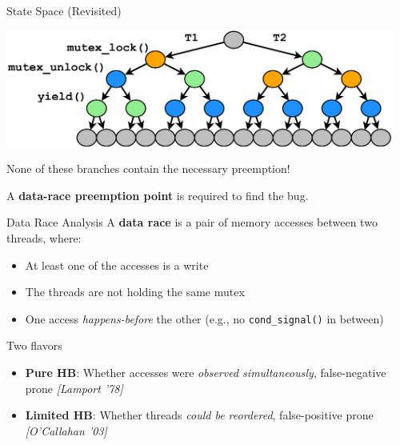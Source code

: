 \documentclass[xcolor=dvipsnames]{beamer}
\begin{document}
\begin{frame}{State Space (Revisited)}
	\begin{center}
		\includegraphics[width=0.96\textwidth]{../../oopsla/tree-maximal-only.pdf}
		\linegap

		None of these branches contain the necessary preemption!
		\linegap

		A {\bf data-race preemption point} is required to find the bug.
	\end{center}
\end{frame}

\begin{frame}{Data Race Analysis}
	A {\bf data race} is a pair of memory accesses between two threads, where:
	\begin{itemize}
		\item At least one of the accesses is a write
		\item The threads are not holding the same mutex
		\item One access {\em happens-before} the other
			(e.g., no \texttt{cond\_signal()} in between)
	\end{itemize}
	\pause
	\linegap

	Two flavors
	\begin{itemize}
		\item {\bf Pure HB}: Whether accesses were {\em observed simultaneously}, false-negative prone
			{\em [Lamport '78]}
		\item {\bf Limited HB}: Whether threads {\em could be reordered}, false-positive prone
			{\em [O'Callahan '03]}
	\end{itemize}
\end{frame}
\end{document}
